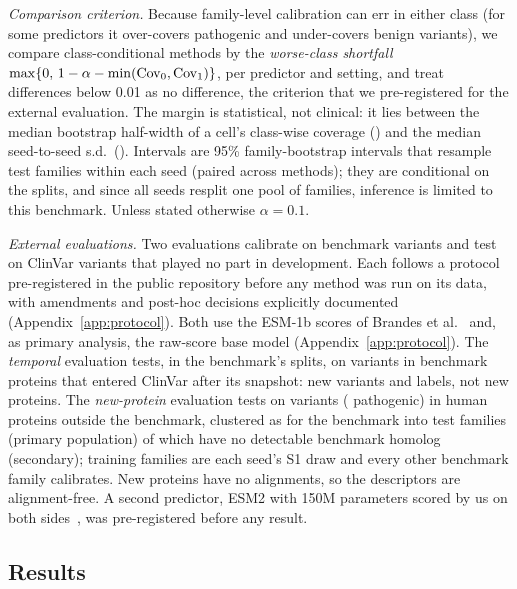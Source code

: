 \emph{Comparison criterion.} Because family-level calibration can err in either class (for some predictors it over-covers pathogenic and under-covers benign variants), we compare class-conditional methods by the \emph{worse-class shortfall} $\max\{0,\,1-\alpha-\min(\mathrm{Cov}_0,\mathrm{Cov}_1)\}$, per predictor and setting, and treat differences below 0.01 as no difference, the criterion that we pre-registered for the external evaluation. The margin is statistical, not clinical: it lies between the median bootstrap half-width of a cell's class-wise coverage (\marginBootHw{}) and the median seed-to-seed s.d.\ (\marginSeedSd{}). Intervals are 95\% family-bootstrap intervals that resample test families within each seed (paired across methods); they are conditional on the splits, and since all seeds resplit one pool of families, inference is limited to this benchmark. Unless stated otherwise $\alpha=0.1$.

\emph{External evaluations.} Two evaluations calibrate on benchmark variants and test on ClinVar variants that played no part in development. Each follows a protocol pre-registered in the public repository before any method was run on its data, with amendments and post-hoc decisions explicitly documented (Appendix~\ref{app:protocol}). Both use the ESM-1b scores of Brandes et al.~\cite{brandes2023genome} and, as primary analysis, the raw-score base model (Appendix~\ref{app:protocol}). The \emph{temporal} evaluation tests, in the benchmark's splits, on \extNVar{} variants in \extNProt{} benchmark proteins that entered ClinVar after its snapshot: new variants and labels, not new proteins. The \emph{new-protein} evaluation tests on \unsNVar{} variants (\unsFracPath{} pathogenic) in \unsNProt{} human proteins outside the benchmark, clustered as for the benchmark into \unsNFam{} test families (primary population) of which \unsNFamStrict{} have no detectable benchmark homolog (secondary); training families are each seed's S1 draw and every other benchmark family calibrates. New proteins have no alignments, so the descriptors are alignment-free. A second predictor, ESM2 with 150M parameters scored by us on both sides~\cite{lin2023evolutionary,meier2021language}, was pre-registered before any result.

\subsection{Results}\label{sec:results}

